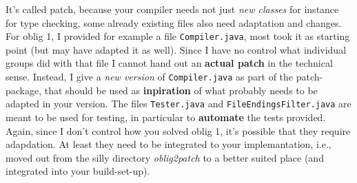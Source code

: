 \documentclass[11pt,freeform]{handout}[2014/08/13]
\begin{document}
It's called patch, because your compiler needs not just \emph{new classes}
for instance for type checking, some already existing files also need
adaptation and changes. For oblig 1, I provided for example a file
\texttt{Compiler.java}, most took it as starting point (but may have
adapted it as well). Since I have no control what individual groups did
with that file I cannot hand out an \textbf{actual patch} in the technical
sense. Instead, I give a \emph{new version} of \texttt{Compiler.java} as
part of the patch-package, that should be used as \textbf{inpiration} of
what probably needs to be adapted in your version. The files
\texttt{Tester.java} and \texttt{FileEndingsFilter.java} are meant to be
used for testing, in particular to \textbf{automate} the tests
provided. Again, since I don't control how you solved oblig 1, it's
possible that they require adapdation. At least they need to be integrated
to your implemantation, i.e., moved out from the silly directory
\emph{oblig2patch} to a better suited place (and integrated into your
build-set-up).











%
% 




\end{document}

